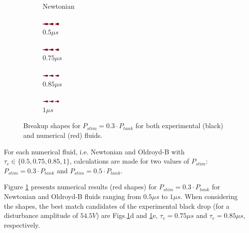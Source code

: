 \documentclass[onecolumn, 12pt]{asme2ej}
\begin{document}
\begin{figure}[h]
\begin{subfigure}[t]{1.2cm}
        \caption{Newtonian}
    \end{subfigure}
    \hfill
    \begin{subfigure}[t]{1.2cm}
        \centering
        \includegraphics[angle=-90,origin=c,width=0.9cm]{Figures/Fig14c.eps}
        \caption{$0.5\mu s$}
    \end{subfigure}\hfill
    \begin{subfigure}[t]{1.2cm}
        \centering
        \includegraphics[angle=-90,origin=c,width=0.9cm]{Figures/Fig14d.eps}
        \caption{$0.75\mu s$}
    \end{subfigure}
    \hfill
    \begin{subfigure}[t]{1.2cm}
        \centering
        \includegraphics[angle=-90,origin=c,width=0.9cm]{Figures/Fig14e.eps}
        \caption{$0.85\mu s$}
    \end{subfigure}
    \hfill
    \begin{subfigure}[t]{1.2cm}
        \centering
        \includegraphics[angle=-90,origin=c,width=0.9cm]{Figures/Fig14f.eps}
        \caption{$1\mu s$}
    \end{subfigure}
       \caption{Breakup shapes for $P_{stim}=0.3\cdot P_{tank}$ for both experimental (black) and numerical (red) fluids.}
       \label{fig:A3}
\end{figure}

For each numerical fluid, i.e. Newtonian and Oldroyd-B with $\tau_e \in  \{0.5,0.75,0.85,1\}$, calculations are made for two values of $P_{stim}$: $P_{stim}= 0.3\cdot P_{tank}$ and $P_{stim}= 0.5\cdot P_{tank}$. 

Figure \ref{fig:A3} presents numerical results (red shapes) for $P_{stim}=0.3\cdot P_{tank}$ for Newtonian and Oldroyd-B fluids ranging from $0.5 \mu s$  to $1 \mu s$. When considering the shapes, the best match candidates of the experimental black drop (for a disturbance amplitude of $54.5V$) are Figs.\ref{fig:A3}d and \ref{fig:A3}e, $\tau_e = 0.75 \mu s$  and $\tau_e = 0.85 \mu s$, respectively.
\end{document}
